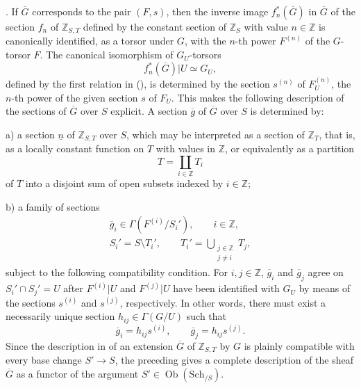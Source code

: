 
\medskip
\noindent {}.  If $\overline G$ corresponds to the pair $(F,s)$, then the
inverse image $f_n^*(\overline G)$ in $\overline G$ of the section $f_n$ of
$\mathbb Z_{S,T}$ defined by the constant section of $\mathbb Z_S$ with
value $n\in\mathbb Z$ is canonically identified, as a torsor under $G$, with
the $n$-th power $F^{(n)}$ of the $G$-torsor $F$.  The canonical isomorphism
of $G_U$-torsors
\[
 f_n^*(\overline G)|U\simeq G_U,
\]
defined by the first relation in (), is determined by the section
$s^{(n)}$ of $F_U^{(n)}$, the $n$-th power of the given section $s$ of
$F_U$.  This makes the following description of the sections of
$\overline G$ over $S$ explicit.  A section $\overline g$ of $\overline G$
over $S$ is determined by:

\smallskip
\noindent a) a section $\underline n$ of $\mathbb Z_{S,T}$ over $S$, which
may be interpreted as a section of $\mathbb Z_T$, that is, as a locally
constant function on $T$ with values in $\mathbb Z$, or equivalently as a
partition
\[
 T=\coprod_{i\in\mathbb Z}T_i
\]
of $T$ into a disjoint sum of open subsets indexed by $i\in\mathbb Z$;

\smallskip
\noindent b) a family of sections
\[
 \begin{gathered}
  \overline g_i\in\Gamma(F^{(i)}/S_i'),\qquad i\in\mathbb Z,\\
  S_i'=S\setminus T_i',\qquad
  T_i'=\displaystyle\bigcup_{\substack{j\in\mathbb Z\\j\ne i}}T_j,
 \end{gathered}
\]
subject to the following compatibility condition.  For $i,j\in\mathbb Z$,
$\overline g_i$ and $\overline g_j$ agree on $S_i'\cap S_j'=U$ after
$F^{(i)}|U$ and $F^{(j)}|U$ have been identified with $G_U$ by means of the
sections $s^{(i)}$ and $s^{(j)}$, respectively.  In other words, there must
exist a necessarily unique section $h_{ij}\in\Gamma(G/U)$ such that
\[
 \overline g_i=h_{ij}s^{(i)},\qquad
 \overline g_j=h_{ij}s^{(j)}.
\]
Since the description in  of an extension $\overline G$ of
$\mathbb Z_{S,T}$ by $G$ is plainly compatible with every base change
$S'\to S$, the preceding gives a complete description of the sheaf
$\overline G$ as a functor of the argument
$S'\in\operatorname{Ob}(\mathrm{Sch}_{/S})$.

